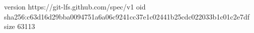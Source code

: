 version https://git-lfs.github.com/spec/v1
oid sha256:c63d16d29bba0094751a6a06c9241cc37e1c02441b25cdc022033b1c01c2e7df
size 63113
